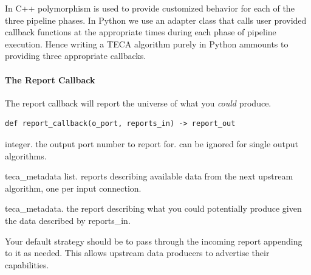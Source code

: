 \documentclass[a4paper,10pt,DIV=12]{scrreprt}
\begin{document}
\noindent In C++ polymorphism is used to provide customized behavior for each of the three pipeline phases. In Python we use an adapter class that calls user provided callback functions at the appropriate times during each phase of pipeline execution. Hence writing a TECA algorithm purely in Python ammounts to providing three appropriate callbacks.

\paragraph{The Report Callback}
The report callback will report the universe of what you \emph{could} produce.
\begin{verbatim}
def report_callback(o_port, reports_in) -> report_out
\end{verbatim}
\noindent\hspace{0.25in}\begin{minipage}{0.8\textwidth}
\begin{description}
 \setlength\itemsep{0mm}
 \item[o\_port] integer. the output port number to report for. can be ignored for single output algorithms.
 \item[reports\_in] teca\_metadata list. reports describing available data from the next upstream algorithm, one per input connection.
 \item[report\_out] teca\_metadata. the report describing what you could potentially produce given the data described by reports\_in.
\end{description}
\vspace{2mm}
\end{minipage}

\noindent Your default strategy should be to pass through the incoming report appending to it as needed. This allows upstream data producers to advertise their capabilities.
\end{document}
